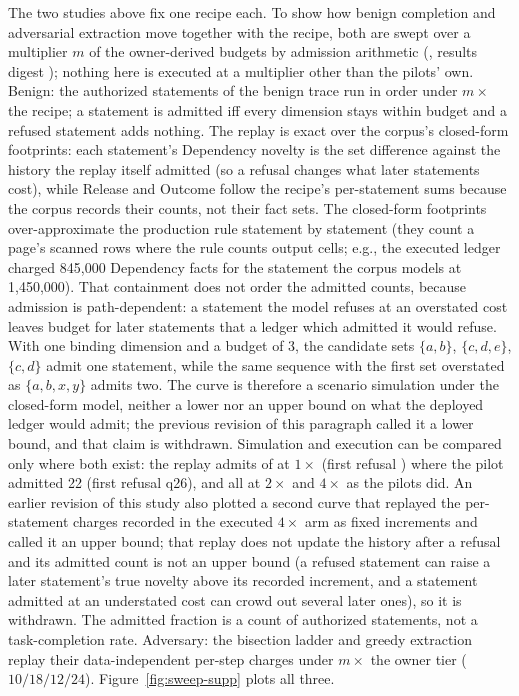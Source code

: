 \documentclass[journal,onecolumn]{IEEEtran}
\begin{document}
The two studies above fix one recipe each. To show how benign completion and
adversarial extraction move together with the recipe, both are swept over a
multiplier $m$ of the owner-derived budgets by admission arithmetic
(, results digest
\SweepResultsDigest{}); nothing here is executed at a multiplier other than
the pilots' own. Benign: the \SweepBenignAuthorized{} authorized statements
of the benign trace run in order under $m\times$ the recipe; a statement is
admitted iff every dimension stays within budget and a refused statement
adds nothing. The replay is exact over the corpus's closed-form footprints:
each statement's Dependency novelty is the set difference against the
history the replay itself admitted (so a refusal changes what later
statements cost), while Release and Outcome follow the recipe's per-statement
sums because the corpus records their counts, not their fact sets. The
closed-form footprints over-approximate the production rule statement by
statement (they count a page's scanned rows where the rule counts output
cells; e.g., the executed ledger charged 845,000 Dependency facts for the
statement the corpus models at 1,450,000). That containment does not order
the admitted counts, because admission is path-dependent: a statement the
model refuses at an overstated cost leaves budget for later statements that
a ledger which admitted it would refuse. With one binding dimension and a
budget of 3, the candidate sets $\{a,b\}$, $\{c,d,e\}$, $\{c,d\}$ admit one
statement, while the same sequence with the first set overstated as
$\{a,b,x,y\}$ admits two. The curve is therefore a scenario simulation under
the closed-form model, neither a lower nor an upper bound on what the
deployed ledger would admit; the previous revision of this paragraph called
it a lower bound, and that claim is withdrawn. Simulation and execution can
be compared only where both exist: the replay admits
\SweepBenignOneAdmitted{} of \SweepBenignAuthorized{} at $1\times$ (first
refusal \SweepBenignFirstRefusalOne{}) where the pilot admitted 22 (first
refusal q26), and all at $2\times$ and $4\times$ as the pilots did.
An earlier revision of this study also plotted a second curve that replayed
the per-statement charges recorded in the executed $4\times$ arm as fixed
increments and called it an upper bound; that replay does not update the
history after a refusal and its admitted count is not an upper bound (a
refused statement can raise a later statement's true novelty above its
recorded increment, and a statement admitted at an understated cost can
crowd out several later ones), so it is withdrawn. The admitted fraction is
a count of authorized statements, not a task-completion rate. Adversary: the
bisection ladder and greedy extraction replay their data-independent per-step
charges under $m\times$ the owner tier ($10/18/12/24$).
Figure~\ref{fig:sweep-supp} plots all three.
\end{document}
